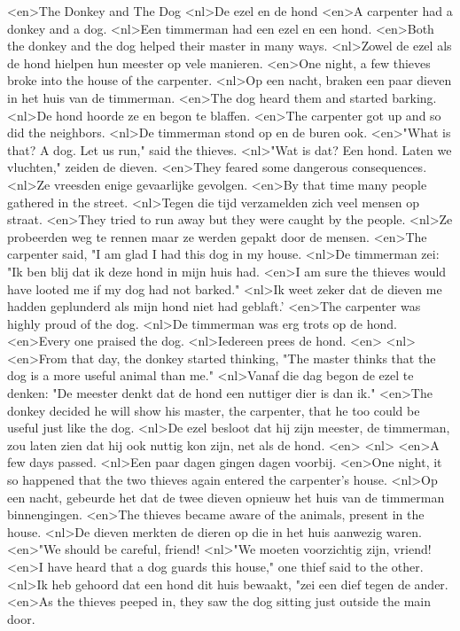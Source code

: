 <en>The Donkey and The Dog
<nl>De ezel en de hond
<en>A carpenter had a donkey and a dog.
<nl>Een timmerman had een ezel en een hond.
<en>Both the donkey and the dog helped their master in many ways.
<nl>Zowel de ezel als de hond hielpen hun meester op vele manieren.
<en>One night, a few thieves broke into the house of the carpenter.
<nl>Op een nacht, braken een paar dieven in het huis van de timmerman.
<en>The dog heard them and started barking.
<nl>De hond hoorde ze en begon te blaffen.
<en>The carpenter got up and so did the neighbors.
<nl>De timmerman stond op en de buren ook.
<en>"What is that? A dog. Let us run," said the thieves.
<nl>"Wat is dat? Een hond. Laten we vluchten," zeiden de dieven.
<en>They feared some dangerous consequences.
<nl>Ze vreesden enige gevaarlijke gevolgen.
<en>By that time many people gathered in the street.
<nl>Tegen die tijd verzamelden zich veel mensen op straat.
<en>They tried to run away but they were caught by the people.
<nl>Ze probeerden weg te rennen maar ze werden gepakt door de mensen.
<en>The carpenter said, "I am glad I had this dog in my house.
<nl>De timmerman zei: "Ik ben blij dat ik deze hond in mijn huis had.
<en>I am sure the thieves would have looted me if my dog had not barked."
<nl>Ik weet zeker dat de dieven me hadden geplunderd als mijn hond niet had geblaft.'
<en>The carpenter was highly proud of the dog.
<nl>De timmerman was erg trots op de hond.
<en>Every one praised the dog.
<nl>Iedereen prees de hond.
<en>
<nl>
<en>From that day, the donkey started thinking, "The master thinks that the dog is a more useful animal than me."
<nl>Vanaf die dag begon de ezel te denken: "De meester denkt dat de hond een nuttiger dier is dan ik."
<en>The donkey decided he will show his master, the carpenter, that he too could be useful just like the dog.
<nl>De ezel besloot dat hij zijn meester, de timmerman, zou laten zien dat hij ook nuttig kon zijn, net als de hond.
<en>
<nl>
<en>A few days passed.
<nl>Een paar dagen gingen dagen voorbij.
<en>One night, it so happened that the two thieves again entered the carpenter’s house.
<nl>Op een nacht, gebeurde het dat de twee dieven opnieuw het huis van de timmerman binnengingen.
<en>The thieves became aware of the animals, present in the house.
<nl>De dieven merkten de dieren op die in het huis aanwezig waren.
<en>"We should be careful, friend!
<nl>"We moeten voorzichtig zijn, vriend!
<en>I have heard that a dog guards this house," one thief said to the other.
<nl>Ik heb gehoord dat een hond dit huis bewaakt, "zei een dief tegen de ander.
<en>As the thieves peeped in, they saw the dog sitting just outside the main door.
